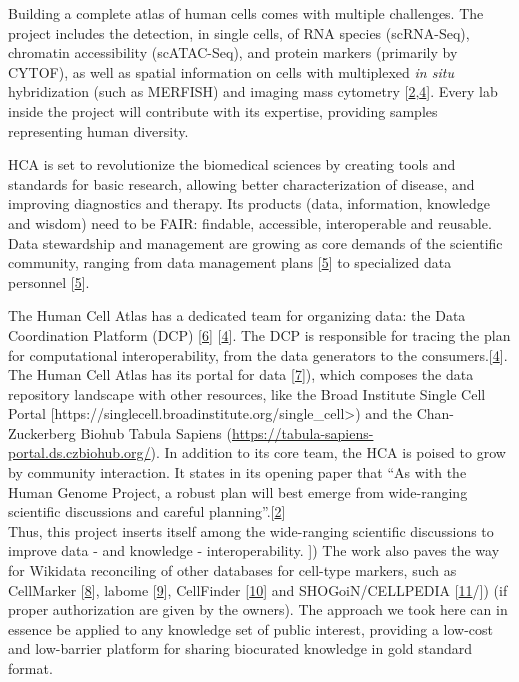 Building a complete atlas of human cells comes with multiple challenges. The project includes the detection, in single cells, of RNA species (scRNA-Seq), chromatin accessibility (scATAC-Seq), and protein markers (primarily by CYTOF), as well as spatial information on cells with multiplexed \emph{in situ} hybridization (such as MERFISH) and imaging mass cytometry {[}\protect\hyperlink{ref-1GmbExweg}{2},\protect\hyperlink{ref-kkwRTArg}{4}{]}. Every lab inside the project will contribute with its expertise, providing samples representing human diversity.

HCA is set to revolutionize the biomedical sciences by creating tools and standards for basic research, allowing better characterization of disease, and improving diagnostics and therapy.
Its products (data, information, knowledge and wisdom) need to be FAIR: findable, accessible, interoperable and reusable.
Data stewardship and management are growing as core demands of the scientific community, ranging from data management plans {[}\protect\hyperlink{ref-1DSEIjFha}{5}{]} to specialized data personnel {[}\protect\hyperlink{ref-1DSEIjFha}{5}{]}.

The Human Cell Atlas has a dedicated team for organizing data: the Data Coordination Platform (DCP) {[}\protect\hyperlink{ref-zDRzmIGu}{6}{]} {[}\protect\hyperlink{ref-kkwRTArg}{4}{]}.
The DCP is responsible for tracing the plan for computational interoperability, from the data generators to the consumers.{[}\protect\hyperlink{ref-kkwRTArg}{4}{]}.
The Human Cell Atlas has its portal for data {[}\protect\hyperlink{ref-kX6KnbUo}{7}{]}), which composes the data repository landscape with other resources, like the Broad Institute Single Cell Portal {[}https://singlecell.broadinstitute.org/single\_cell\textgreater) and the Chan-Zuckerberg Biohub Tabula Sapiens (\url{https://tabula-sapiens-portal.ds.czbiohub.org/}).
In addition to its core team, the HCA is poised to grow by community interaction. It states in its opening paper that ``As with the Human Genome Project, a robust plan will best emerge from wide-ranging scientific discussions and careful planning''.{[}\protect\hyperlink{ref-1GmbExweg}{2}{]}\\
Thus, this project inserts itself among the wide-ranging scientific discussions to improve data - and knowledge - interoperability. {]})
The work also paves the way for Wikidata reconciling of other databases for cell-type markers, such as CellMarker {[}\protect\hyperlink{ref-chGii6yw}{8}{]}, labome {[}\protect\hyperlink{ref-rhRRCtlA}{9}{]}, CellFinder {[}\protect\hyperlink{ref-4AEy2xhQ}{10}{]} and SHOGoiN/CELLPEDIA {[}\protect\hyperlink{ref-6uWWsiSq}{11}/{]}) (if proper authorization are given by the owners).
The approach we took here can in essence be applied to any knowledge set of public interest, providing a low-cost and low-barrier platform for sharing biocurated knowledge in gold standard format.

